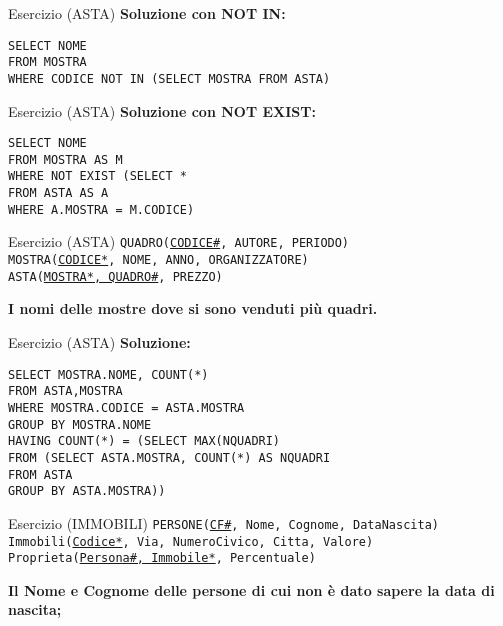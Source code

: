 \begin{frame}{Esercizio (ASTA)}
    \textbf{Soluzione con NOT IN:}
    \vspace{1em}
    
    \texttt{SELECT NOME \\FROM MOSTRA \\WHERE CODICE NOT IN (SELECT MOSTRA FROM ASTA)}
    \end{frame}

\begin{frame}{Esercizio (ASTA)}
    \textbf{Soluzione con NOT EXIST:}
    \vspace{1em}
    
    \texttt{SELECT NOME \\FROM MOSTRA AS M \\WHERE NOT EXIST (SELECT * \\\hspace{8.5em}FROM ASTA AS A \\\hspace{8.5em}WHERE A.MOSTRA = M.CODICE)}
    \end{frame}
\begin{frame}{Esercizio (ASTA) } 
    \texttt{QUADRO(\underline{CODICE\#}, AUTORE, PERIODO)\\
    MOSTRA(\underline{CODICE*}, NOME, ANNO, ORGANIZZATORE)\\
    ASTA(\underline{MOSTRA*, QUADRO\#}, PREZZO)}
    \vspace{1em}
    
    \textbf{I nomi delle mostre dove si sono venduti pi\`u quadri.}
\end{frame}

\begin{frame}{Esercizio (ASTA)}
    \textbf{Soluzione:}
    \vspace{1em}
    
    \texttt{SELECT MOSTRA.NOME, COUNT(*) \\FROM ASTA,MOSTRA\\WHERE MOSTRA.CODICE = ASTA.MOSTRA\\GROUP BY MOSTRA.NOME\\HAVING COUNT(*) = (SELECT MAX(NQUADRI)\\\hspace{9,5em}FROM
(SELECT ASTA.MOSTRA, COUNT(*) AS NQUADRI \\\hspace{12,5em}FROM ASTA \\\hspace{12,5em}GROUP BY ASTA.MOSTRA))}
    \end{frame}
\begin{frame}{Esercizio (IMMOBILI) } 
    \texttt{PERSONE(\underline{CF\#}, Nome, Cognome, DataNascita)\\
    Immobili(\underline{Codice*}, Via, NumeroCivico, Citta, Valore)\\
    Proprieta(\underline{Persona\#, Immobile*}, Percentuale)}
    \vspace{1em}
    
    \textbf{Il Nome e Cognome delle persone di cui non \`e dato sapere la data di nascita;}
\end{frame}

